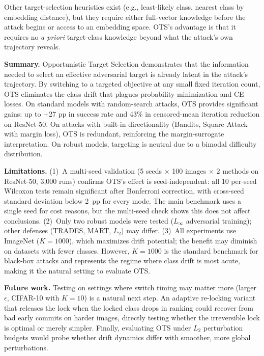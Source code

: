 \documentclass{cap2026}
\begin{document}
Other target-selection heuristics exist (e.g., least-likely class, nearest class by embedding distance), but they require either full-vector knowledge before the attack begins or access to an embedding space. OTS's advantage is that it requires no \textit{a priori} target-class knowledge beyond what the attack's own trajectory reveals.

\textbf{Summary.} Opportunistic Target Selection demonstrates that the information needed to select an effective adversarial target is already latent in the attack's trajectory. By switching to a targeted objective at any small fixed iteration count, OTS eliminates the class drift that plagues probability-minimization and CE losses. On standard models with random-search attacks, OTS provides significant gains: up to +27 pp in success rate and 43\% in censored-mean iteration reduction on ResNet-50. On attacks with built-in directionality (Bandits, Square Attack with margin loss), OTS is redundant, reinforcing the margin-surrogate interpretation. On robust models, targeting is neutral due to a bimodal difficulty distribution.

\textbf{Limitations.}\label{sec:limitations}
(1)~A multi-seed validation (5 seeds $\times$ 100 images $\times$ 2 methods on ResNet-50, 3{,}000 runs) confirms OTS's effect is seed-independent: all 10 per-seed Wilcoxon tests remain significant after Bonferroni correction, with cross-seed standard deviation below 2~pp for every mode. The main benchmark uses a single seed for cost reasons, but the multi-seed check shows this does not affect conclusions.
(2)~Only two robust models were tested ($L_\infty$ adversarial training); other defenses (TRADES, MART, $L_2$) may differ.
(3)~All experiments use ImageNet ($K = 1000$), which maximizes drift potential; the benefit may diminish on datasets with fewer classes. However, $K = 1000$ is the standard benchmark for black-box attacks and represents the regime where class drift is most acute, making it the natural setting to evaluate OTS.

\textbf{Future work.}
Testing on settings where switch timing may matter more (larger $\epsilon$, CIFAR-10 with $K=10$) is a natural next step. An adaptive re-locking variant that releases the lock when the locked class drops in ranking could recover from bad early commits on harder images, directly testing whether the irreversible lock is optimal or merely simpler. Finally, evaluating OTS under $L_2$ perturbation budgets would probe whether drift dynamics differ with smoother, more global perturbations.

\end{document}
